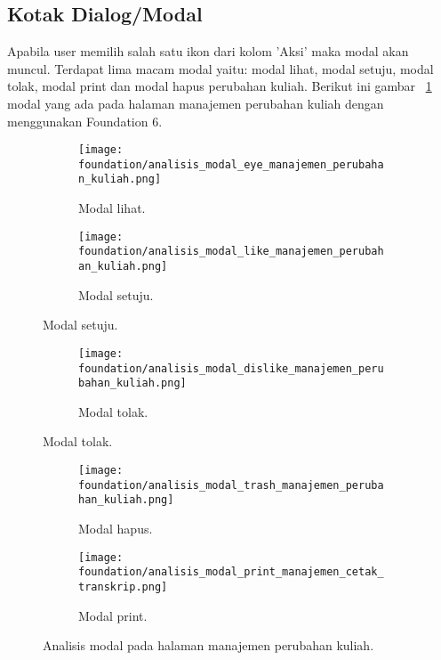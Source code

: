 \subsection{Kotak Dialog/Modal}
Apabila user memilih salah satu ikon dari kolom 'Aksi' maka modal akan muncul. Terdapat lima macam modal yaitu: modal lihat, modal setuju, modal tolak, modal print dan modal hapus perubahan kuliah. 
Berikut ini gambar ~\ref{fig:analisisModalManajemenPerubahanKuliah} modal yang ada pada halaman manajemen perubahan kuliah dengan menggunakan Foundation 6.
\begin{figure} [H]	
	\centering
	\begin{subfigure}[b]{0.45\linewidth} 
		\texttt{[image: foundation/analisis\_modal\_eye\_manajemen\_perubahan\_kuliah.png]}
		\caption{Modal lihat.}  
	\end{subfigure}	
	\begin{subfigure}[b]{0.3\linewidth}   
		\texttt{[image: foundation/analisis\_modal\_like\_manajemen\_perubahan\_kuliah.png]}
		\caption{Modal setuju.}
	\end{subfigure}
\end{figure}

\begin{figure} [H] 
	\centering
	\ContinuedFloat
	\begin{subfigure}[b]{0.6\linewidth}
		\texttt{[image: foundation/analisis\_modal\_dislike\_manajemen\_perubahan\_kuliah.png]}
		\caption{Modal tolak.}  
	\end{subfigure}
\end{figure}

\begin{figure} [H] 
	\centering
	\ContinuedFloat
	\begin{subfigure}[b]{0.35\linewidth} 
		\texttt{[image: foundation/analisis\_modal\_trash\_manajemen\_perubahan\_kuliah.png]}
		\caption{Modal hapus.}
	\end{subfigure}
	\begin{subfigure}[b]{0.55\linewidth}
		\texttt{[image: foundation/analisis\_modal\_print\_manajemen\_cetak\_transkrip.png]}
		\caption{Modal print.}  
	\end{subfigure}	 
	\caption{Analisis modal pada halaman manajemen perubahan kuliah.}
	\label{fig:analisisModalManajemenPerubahanKuliah}
\end{figure}

